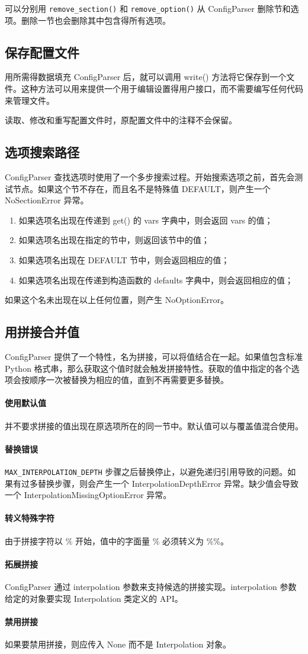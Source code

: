 可以分别用 \verb|remove_section()| 和 \verb|remove_option()| 从 ConfigParser 删除节和选项。删除一节也会删除其中包含得所有选项。

\subsection{保存配置文件}
用所需得数据填充 ConfigParser 后，就可以调用 write() 方法将它保存到一个文件。这种方法可以用来提供一个用于编辑设置得用户接口，而不需要编写任何代码来管理文件。

\begin{tcolorbox}[title=警告]
    读取、修改和重写配置文件时，原配置文件中的注释不会保留。
\end{tcolorbox}

\subsection{选项搜索路径}
ConfigParser 查找选项时使用了一个多步搜索过程。开始搜索选项之前，首先会测试节点。如果这个节不存在，而且名不是特殊值 DEFAULT，则产生一个 NoSectionError 异常。
\begin{enumerate}
    \item 如果选项名出现在传递到 get() 的 vars 字典中，则会返回 vars 的值；
    \item 如果选项名出现在指定的节中，则返回该节中的值；
    \item 如果选项名出现在 DEFAULT 节中，则会返回相应的值；
    \item 如果选项名出现在传递到构造函数的 defaults 字典中，则会返回相应的值；
\end{enumerate}
如果这个名未出现在以上任何位置，则产生 NoOptionError。

\subsection{用拼接合并值}
ConfigParser 提供了一个特性，名为拼接，可以将值结合在一起。如果值包含标准 Python 格式串，那么获取这个值时就会触发拼接特性。获取的值中指定的各个选项会按顺序一次被替换为相应的值，直到不再需要更多替换。

\paragraph{使用默认值} 并不要求拼接的值出现在原选项所在的同一节中。默认值可以与覆盖值混合使用。

\paragraph{替换错误} \verb|MAX_INTERPOLATION_DEPTH| 步骤之后替换停止，以避免递归引用导致的问题。如果有过多替换步骤，则会产生一个 InterpolationDepthError 异常。缺少值会导致一个 InterpolationMissingOptionError 异常。
\paragraph{转义特殊字符} 由于拼接字符以 \% 开始，值中的字面量 \% 必须转义为 \%\%。

\paragraph{拓展拼接} ConfigParser 通过 interpolation 参数来支持候选的拼接实现。interpolation 参数给定的对象要实现 Interpolation 类定义的 API。
\paragraph{禁用拼接} 如果要禁用拼接，则应传入 None 而不是 Interpolation 对象。